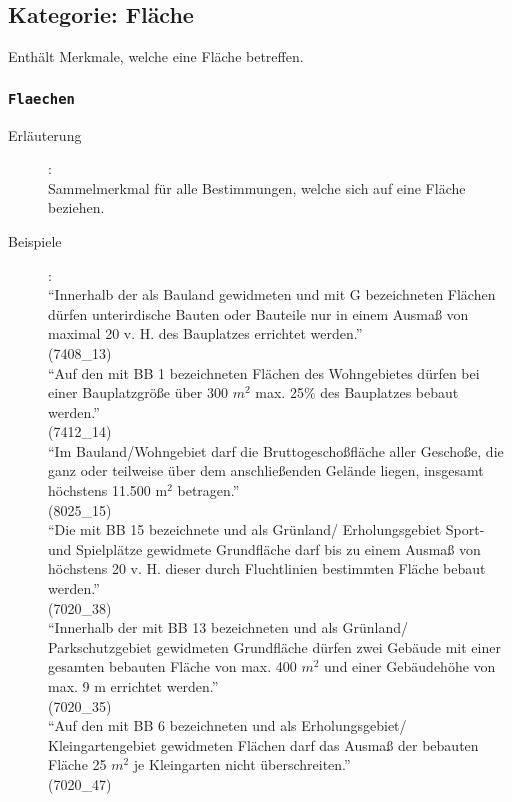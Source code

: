 \documentclass{article}
\newcommand{\mml}[1]{\texttt{#1}}
\newcommand{\merkmal}[2]{\subsubsection{\mml{#1}}\label{merkmal:#1}\index{\category! #1}\begin{description}#2\end{description}\medskip}
\newcommand{\erlaeuterung}[1]{\item[Erläuterung]:\\ #1 }
\newcommand{\wert}[1]{\item[Wert]:\\ #1 }
\newcommand{\beispiel}[1]{\item[Beispiele]:\\ #1 }
\newcommand{\rechtsmaterie}[1]{\item[Rechtsmaterie]:  \\#1 }
\newcommand{\category}{none}
\begin{document}

\subsection{Kategorie: Fläche}
\label{sec:kategorie:flache}

\renewcommand{\category}{Fläche}

Enthält Merkmale, welche eine Fläche betreffen. %
\smallskip

\merkmal{Flaechen}{
  \erlaeuterung{Sammelmerkmal für alle Bestimmungen, welche sich auf eine
    Fläche beziehen.}
  \beispiel{
    "`Innerhalb der als Bauland gewidmeten und mit G
    bezeichneten Flächen dürfen unterirdische Bauten oder Bauteile nur
    in einem Ausmaß von maximal 20 v. H. des Bauplatzes errichtet
    werden."' \\(7408\_13)\smallskip\\
    "`Auf den mit BB 1 bezeichneten Flächen des Wohngebietes
    dürfen bei einer Bauplatzgröße über 300 $m^2$ max. 25\% des
    Bauplatzes bebaut werden."'\\(7412\_14) \smallskip\\
    "`Im Bauland/Wohngebiet darf die Bruttogeschoßfläche aller
    Geschoße, die ganz oder teilweise über dem anschließenden Gelände
    liegen, insgesamt höchstens 11.500 $\mathrm{m}^2$
    betragen."'\\(8025\_15) \smallskip\\
    "`Die mit BB 15 bezeichnete und als Grünland/
    Erholungsgebiet Sport- und Spielplätze gewidmete Grundfläche darf
    bis zu einem Ausmaß von höchstens 20 v. H. dieser durch
    Fluchtlinien bestimmten Fläche bebaut werden."'\\
    (7020\_38) \smallskip\\
    "`Innerhalb der mit BB 13 bezeichneten und als Grünland/
    Parkschutzgebiet gewidmeten Grundfläche dürfen zwei Gebäude mit
    einer gesamten bebauten Fläche von max. 400 $m^2$ und einer
    Gebäudehöhe von max. 9 m errichtet werden."'\\(7020\_35) \smallskip\\
    "`Auf den mit BB 6 bezeichneten und als Erholungsgebiet/
    Kleingartengebiet gewidmeten Flächen darf das Ausmaß der bebauten
    Fläche 25 $m^2$ je Kleingarten nicht überschreiten."'\\(7020\_47) \smallskip\\
}}
\end{document}
